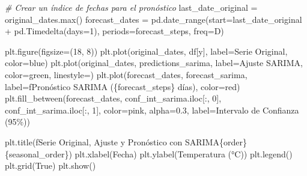\documentclass[
  11pt,
]{article}
\newenvironment{Shaded}{}{}
\newcommand{\BuiltInTok}[1]{\textcolor[rgb]{0.00,0.50,0.00}{#1}}
\newcommand{\CommentTok}[1]{\textcolor[rgb]{0.38,0.63,0.69}{\textit{#1}}}
\newcommand{\DecValTok}[1]{\textcolor[rgb]{0.25,0.63,0.44}{#1}}
\newcommand{\FloatTok}[1]{\textcolor[rgb]{0.25,0.63,0.44}{#1}}
\newcommand{\NormalTok}[1]{#1}
\newcommand{\OperatorTok}[1]{\textcolor[rgb]{0.40,0.40,0.40}{#1}}
\newcommand{\SpecialCharTok}[1]{\textcolor[rgb]{0.25,0.44,0.63}{#1}}
\newcommand{\SpecialStringTok}[1]{\textcolor[rgb]{0.73,0.40,0.53}{#1}}
\newcommand{\StringTok}[1]{\textcolor[rgb]{0.25,0.44,0.63}{#1}}
\newcommand{\VariableTok}[1]{\textcolor[rgb]{0.10,0.09,0.49}{#1}}
\begin{document}
\begin{Shaded}
\begin{Highlighting}[]
\CommentTok{\# Crear un índice de fechas para el pronóstico}
\NormalTok{last\_date\_original }\OperatorTok{=}\NormalTok{ original\_dates.}\BuiltInTok{max}\NormalTok{()}
\NormalTok{forecast\_dates }\OperatorTok{=}\NormalTok{ pd.date\_range(start}\OperatorTok{=}\NormalTok{last\_date\_original }\OperatorTok{+}\NormalTok{ pd.Timedelta(days}\OperatorTok{=}\DecValTok{1}\NormalTok{), periods}\OperatorTok{=}\NormalTok{forecast\_steps, freq}\OperatorTok{=}\StringTok{\textquotesingle{}D\textquotesingle{}}\NormalTok{)}

\NormalTok{plt.figure(figsize}\OperatorTok{=}\NormalTok{(}\DecValTok{18}\NormalTok{, }\DecValTok{8}\NormalTok{))}
\NormalTok{plt.plot(original\_dates, df[}\StringTok{\textquotesingle{}y\textquotesingle{}}\NormalTok{], label}\OperatorTok{=}\StringTok{\textquotesingle{}Serie Original\textquotesingle{}}\NormalTok{, color}\OperatorTok{=}\StringTok{\textquotesingle{}blue\textquotesingle{}}\NormalTok{)}
\NormalTok{plt.plot(original\_dates, predictions\_sarima, label}\OperatorTok{=}\StringTok{\textquotesingle{}Ajuste SARIMA\textquotesingle{}}\NormalTok{, color}\OperatorTok{=}\StringTok{\textquotesingle{}green\textquotesingle{}}\NormalTok{, linestyle}\OperatorTok{=}\StringTok{\textquotesingle{}{-}{-}\textquotesingle{}}\NormalTok{)}
\NormalTok{plt.plot(forecast\_dates, forecast\_sarima, label}\OperatorTok{=}\SpecialStringTok{f\textquotesingle{}Pronóstico SARIMA (}\SpecialCharTok{\{}\NormalTok{forecast\_steps}\SpecialCharTok{\}}\SpecialStringTok{ días)\textquotesingle{}}\NormalTok{, color}\OperatorTok{=}\StringTok{\textquotesingle{}red\textquotesingle{}}\NormalTok{)}
\NormalTok{plt.fill\_between(forecast\_dates,}
\NormalTok{                 conf\_int\_sarima.iloc[:, }\DecValTok{0}\NormalTok{],}
\NormalTok{                 conf\_int\_sarima.iloc[:, }\DecValTok{1}\NormalTok{],}
\NormalTok{                 color}\OperatorTok{=}\StringTok{\textquotesingle{}pink\textquotesingle{}}\NormalTok{, alpha}\OperatorTok{=}\FloatTok{0.3}\NormalTok{, label}\OperatorTok{=}\StringTok{\textquotesingle{}Intervalo de Confianza (95\%)\textquotesingle{}}\NormalTok{)}

\NormalTok{plt.title(}\SpecialStringTok{f\textquotesingle{}Serie Original, Ajuste y Pronóstico con SARIMA}\SpecialCharTok{\{}\NormalTok{order}\SpecialCharTok{\}\{}\NormalTok{seasonal\_order}\SpecialCharTok{\}}\SpecialStringTok{\textquotesingle{}}\NormalTok{)}
\NormalTok{plt.xlabel(}\StringTok{\textquotesingle{}Fecha\textquotesingle{}}\NormalTok{)}
\NormalTok{plt.ylabel(}\StringTok{\textquotesingle{}Temperatura (°C)\textquotesingle{}}\NormalTok{)}
\NormalTok{plt.legend()}
\NormalTok{plt.grid(}\VariableTok{True}\NormalTok{)}
\NormalTok{plt.show()}


\end{Highlighting}
\end{Shaded}
\end{document}
